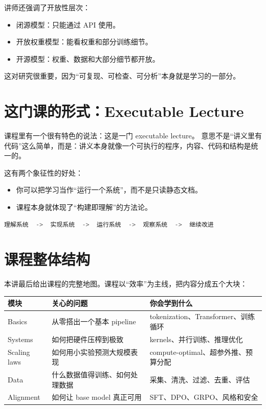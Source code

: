\documentclass[a4paper]{article}
\begin{document}
讲师还强调了开放性层次：
\begin{itemize}
    \item 闭源模型：只能通过 API 使用。
    \item 开放权重模型：能看权重和部分训练细节。
    \item 开源模型：权重、数据和大部分细节都开放。
\end{itemize}

这对研究很重要，因为“可复现、可检查、可分析”本身就是学习的一部分。

\section{这门课的形式：Executable Lecture}

课程里有一个很有特色的说法：这是一门 executable lecture。
意思不是“讲义里有代码”这么简单，而是：讲义本身就像一个可执行的程序，内容、代码和结构是统一的。

这有两个象征性的好处：
\begin{itemize}
    \item 你可以把学习当作“运行一个系统”，而不是只读静态文档。
    \item 课程本身就体现了“构建即理解”的方法论。
\end{itemize}

\begin{lstlisting}[language=Python,caption={课程式讲义的概念性示意}]
理解系统  ->  实现系统  ->  运行系统  ->  观察系统  ->  继续改进
\end{lstlisting}

\section{课程整体结构}

本讲最后给出课程的完整地图。课程以“效率”为主线，把内容分成五个大块：

\begin{table}[H]
\centering
\begin{tabular}{p{2.2cm}p{4.1cm}p{6.8cm}}
\toprule
\textbf{模块} & \textbf{关心的问题} & \textbf{你会学到什么} \\
\midrule
Basics & 从零搭出一个基本 pipeline & tokenization、Transformer、训练循环 \\
Systems & 如何把硬件压榨到极致 & kernels、并行训练、推理优化 \\
Scaling laws & 如何用小实验预测大规模表现 & compute-optimal、超参外推、预算分配 \\
Data & 什么数据值得训练、如何处理数据 & 采集、清洗、过滤、去重、评估 \\
Alignment & 如何让 base model 真正可用 & SFT、DPO、GRPO、风格和安全 \\
\bottomrule
\end{tabular}
\end{table}
\end{document}
